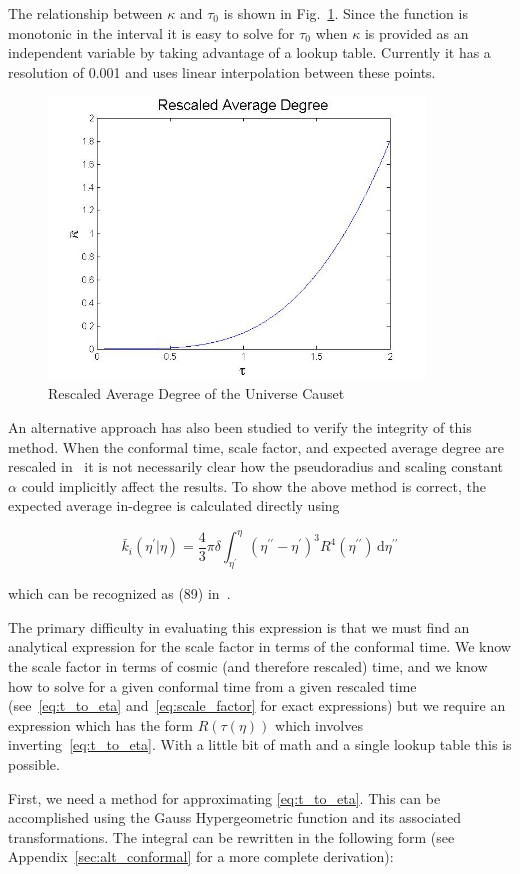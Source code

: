 \documentclass[preprint,notitlepage,amsmath,amssymb,floatfix]{revtex4-1}
\begin{document}
\noindent The relationship between $\kappa$ and $\tau_0$ is shown in Fig.~\ref{fig:kappa_tau}.
Since the function is monotonic in the interval it is easy to solve for $\tau_0$ when $\kappa$ is provided as an independent variable by taking advantage of a lookup table.  
Currently it has a resolution of 0.001 and uses linear interpolation between these points.

\begin{figure}
\includegraphics[width=10cm]{figures/Rescaled_Average_Degree.jpg}
\caption{Rescaled Average Degree of the Universe Causet}
\label{fig:kappa_tau}
\centering
\end{figure}

An alternative approach has also been studied to verify the integrity of this method.
When the conformal time, scale factor, and expected average degree are rescaled in~\cite{ref:snc2012} it is not necessarily clear how the pseudoradius and scaling constant $\alpha$ could implicitly affect the results.
To show the above method is correct, the expected average in-degree is calculated directly using

\begin{equation}
\label{eq:avg_degree_uni}
\bar{k}_i\left(\eta^\prime|\eta\right) = \frac{4}{3}\pi\delta\int_{\eta^\prime}^\eta\!\left(\eta^{\prime\prime} - \eta^\prime\right)^3 R^4\left(\eta^{\prime\prime}\right)\,\mathrm d\eta^{\prime\prime}
\end{equation}

\noindent which can be recognized as (89) in~\cite{ref:snc2012}.

The primary difficulty in evaluating this expression is that we must find an analytical expression for the scale factor in terms of the conformal time.
We know the scale factor in terms of cosmic (and therefore rescaled) time, and we know how to solve for a given conformal time from a given rescaled time (see~\eqref{eq:t_to_eta} and~\eqref{eq:scale_factor} for exact expressions) but we require an expression which has the form $R\left(\tau\left(\eta\right)\right)$ which involves inverting~\eqref{eq:t_to_eta}.
With a little bit of math and a single lookup table this is possible. \par
First, we need a method for approximating \eqref{eq:t_to_eta}.
This can be accomplished using the Gauss Hypergeometric function and its associated transformations.
The integral can be rewritten in the following form (see Appendix~\ref{sec:alt_conformal} for a more complete derivation):
\end{document}
